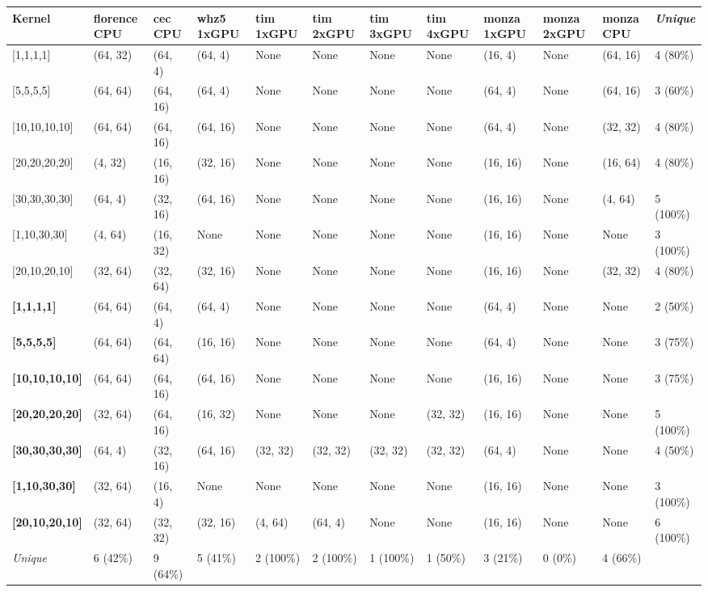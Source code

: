 \begin{tabular}{|p{1.8cm} | p{1cm} | p{1cm} | p{1cm} | p{1cm} | p{1cm} | p{1cm} | p{1cm} | p{1cm} | p{1cm} | p{1cm} | p{1.1cm}|}
\hline
\textbf{Kernel} & \textbf{florence CPU} & \textbf{cec CPU} & \textbf{whz5 1xGPU} & \textbf{tim 1xGPU} & \textbf{tim 2xGPU} & \textbf{tim 3xGPU} & \textbf{tim 4xGPU} & \textbf{monza 1xGPU} & \textbf{monza 2xGPU} & \textbf{monza CPU} & \textit{Unique}\\
\hline
{[}1,1,1,1{]} & (64, 32) & (64, 4) & (64, 4) & None & None & None & None & (16, 4) & None & (64, 16) & 4 (80\%)\\
{[}5,5,5,5{]} & (64, 64) & (64, 16) & (64, 4) & None & None & None & None & (64, 4) & None & (64, 16) & 3 (60\%)\\
{[}10,10,10,10{]} & (64, 64) & (64, 16) & (64, 16) & None & None & None & None & (64, 4) & None & (32, 32) & 4 (80\%)\\
{[}20,20,20,20{]} & (4, 32) & (16, 16) & (32, 16) & None & None & None & None & (16, 16) & None & (16, 64) & 4 (80\%)\\
{[}30,30,30,30{]} & (64, 4) & (32, 16) & (64, 16) & None & None & None & None & (16, 16) & None & (4, 64) & 5 (100\%)\\
{[}1,10,30,30{]} & (4, 64) & (16, 32) & None & None & None & None & None & (16, 16) & None & None & 3 (100\%)\\
{[}20,10,20,10{]} & (32, 64) & (32, 64) & (32, 16) & None & None & None & None & (16, 16) & None & (32, 32) & 4 (80\%)\\
\textbf{{[}1,1,1,1{]}} & (64, 64) & (64, 4) & (64, 4) & None & None & None & None & (64, 4) & None & None & 2 (50\%)\\
\textbf{{[}5,5,5,5{]}} & (64, 64) & (64, 64) & (16, 16) & None & None & None & None & (64, 4) & None & None & 3 (75\%)\\
\textbf{{[}10,10,10,10{]}} & (64, 64) & (64, 16) & (64, 16) & None & None & None & None & (16, 16) & None & None & 3 (75\%)\\
\textbf{{[}20,20,20,20{]}} & (32, 64) & (64, 16) & (16, 32) & None & None & None & (32, 32) & (16, 16) & None & None & 5 (100\%)\\
\textbf{{[}30,30,30,30{]}} & (64, 4) & (32, 16) & (64, 16) & (32, 32) & (32, 32) & (32, 32) & (32, 32) & (64, 4) & None & None & 4 (50\%)\\
\textbf{{[}1,10,30,30{]}} & (32, 64) & (16, 4) & None & None & None & None & None & (16, 16) & None & None & 3 (100\%)\\
\textbf{{[}20,10,20,10{]}} & (32, 64) & (32, 32) & (32, 16) & (4, 64) & (64, 4) & None & None & (16, 16) & None & None & 6 (100\%)\\
\hline
\textit{Unique} & 6 (42\%) & 9 (64\%) & 5 (41\%) & 2 (100\%) & 2 (100\%) & 1 (100\%) & 1 (50\%) & 3 (21\%) & 0 (0\%) & 4 (66\%) & \\
\hline
\end{tabular}
